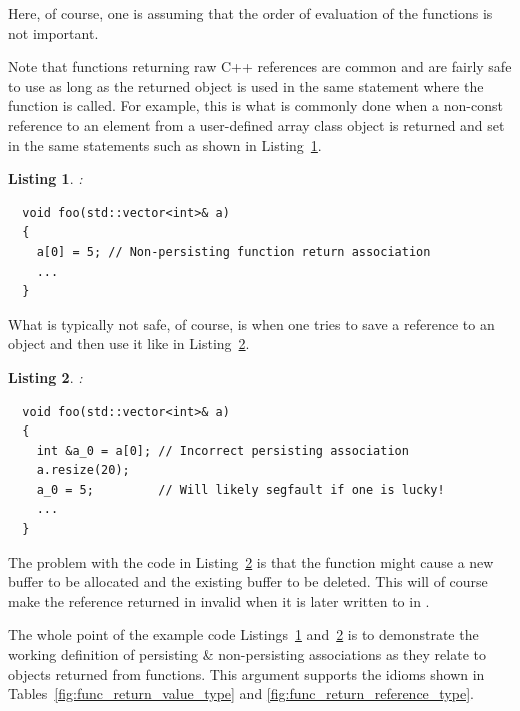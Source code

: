 \documentclass[pdf,ps2pdf,11pt]{SANDreport}
\newtheorem{listing}{Listing}
\begin{document}
Here, of course, one is assuming that the order of evaluation of the
functions is not important.

Note that functions returning raw C++ references are common and are
fairly safe to use as long as the returned object is used in the same
statement where the function is called.  For example, this is what is
commonly done when a non-const reference to an element from a
user-defined array class object is returned and set in the same
statements such as shown in
Listing~\ref{listing:non-persisting-array-return-1}.


\begin{listing}:\\
\label{listing:non-persisting-array-return-1}
{\small\begin{verbatim}
  void foo(std::vector<int>& a)
  {
    a[0] = 5; // Non-persisting function return association
    ...
  }
\end{verbatim}}
\end{listing}


What is typically not safe, of course, is when one tries to save a
reference to an object and then use it like in
Listing~\ref{listing:bad-persisting-array-return-1}.


\begin{listing}:\\
\label{listing:bad-persisting-array-return-1}
{\small\begin{verbatim}
  void foo(std::vector<int>& a)
  {
    int &a_0 = a[0]; // Incorrect persisting association
    a.resize(20);
    a_0 = 5;         // Will likely segfault if one is lucky!
    ...
  }
\end{verbatim}}
\end{listing}


The problem with the code in
Listing~\ref{listing:bad-persisting-array-return-1} is that the
{} function might cause a new buffer to be allocated
and the existing buffer to be deleted.  This will of course make the
reference returned in {} invalid when it is
later written to in {}.

The whole point of the example code
Listings~\ref{listing:non-persisting-array-return-1}
and~\ref{listing:bad-persisting-array-return-1} is to demonstrate the
working definition of persisting \& non-persisting associations as
they relate to objects returned from functions.  This argument
supports the idioms shown in Tables~\ref{fig:func_return_value_type}
and {}\ref{fig:func_return_reference_type}.
\end{document}
